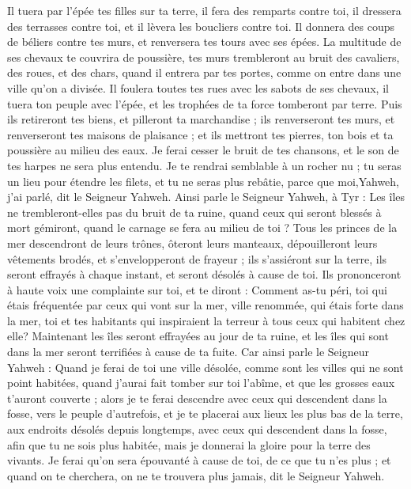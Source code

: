 \begin{multicols}{2}
Il tuera par l'épée tes filles sur ta terre, il fera des remparts contre toi, il dressera des terrasses contre toi, et il lèvera les boucliers contre toi.
Il donnera des coups de béliers contre tes murs, et renversera tes tours avec ses épées.
La multitude de ses chevaux te couvrira de poussière, tes murs trembleront au bruit des cavaliers, des roues, et des chars, quand il entrera par tes portes, comme on entre dans une ville qu’on a divisée.
Il foulera toutes tes rues avec les sabots de ses chevaux, il tuera ton peuple avec l'épée, et les trophées de ta force tomberont par terre.
Puis ils retireront tes biens, et pilleront ta marchandise ; ils renverseront tes murs, et renverseront tes maisons de plaisance ; et ils mettront tes pierres, ton bois et ta poussière au milieu des eaux.
Je ferai cesser le bruit de tes chansons, et le son de tes harpes ne sera plus entendu.
Je te rendrai semblable à un rocher nu ; tu seras un lieu pour étendre les filets, et tu ne seras plus rebâtie, parce que moi,Yahweh, j'ai parlé, dit le Seigneur Yahweh.
Ainsi parle le Seigneur Yahweh, à Tyr : Les îles ne trembleront-elles pas du bruit de ta ruine, quand ceux qui seront blessés à mort gémiront, quand le carnage se fera au milieu de toi ?
Tous les princes de la mer descendront de leurs trônes, ôteront leurs manteaux, dépouilleront leurs vêtements brodés, et s’envelopperont de frayeur ; ils s'assiéront sur la terre, ils seront effrayés à chaque instant, et seront désolés à cause de toi.
Ils prononceront à haute voix une complainte sur toi, et te diront : Comment as-tu péri, toi qui étais fréquentée par ceux qui vont sur la mer, ville renommée, qui étais forte dans la mer, toi et tes habitants qui inspiraient la terreur à tous ceux qui habitent chez elle?
Maintenant les îles seront effrayées au jour de ta ruine, et les îles qui sont dans la mer seront terrifiées à cause de ta fuite.
Car ainsi parle le Seigneur Yahweh : Quand je ferai de toi une ville désolée, comme sont les villes qui ne sont point habitées, quand j'aurai fait tomber sur toi l'abîme, et que les grosses eaux t'auront couverte ;
alors je te ferai descendre avec ceux qui descendent dans la fosse, vers le peuple d'autrefois, et je te placerai aux lieux les plus bas de la terre, aux endroits désolés depuis longtemps, avec ceux qui descendent dans la fosse, afin que tu ne sois plus habitée, mais je donnerai la gloire pour la terre des vivants.
Je ferai qu'on sera épouvanté à cause de toi, de ce que tu n'es plus ; et quand on te cherchera, on ne te trouvera plus jamais, dit le Seigneur Yahweh.

\end{multicols}
